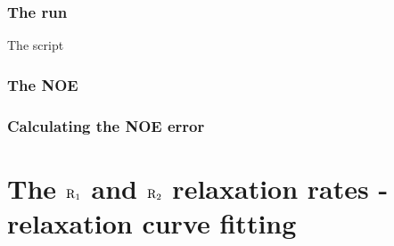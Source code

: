 \subsubsection{The run}

The script 



\subsubsection{The NOE}


\subsubsection{Calculating the NOE error}




\section{The $\mathrm{R}_1$ and $\mathrm{R}_2$ relaxation rates - relaxation curve fitting}
